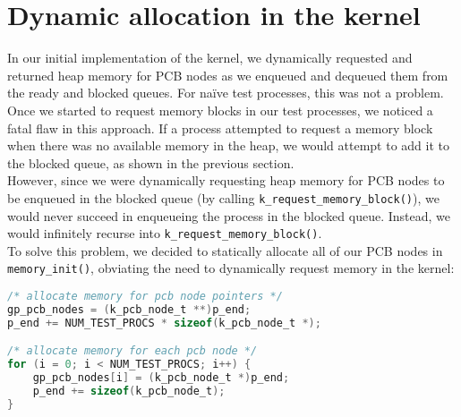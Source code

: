 \documentclass[12pt]{report}
\begin{document}
\section{Dynamic allocation in the kernel}

In our initial implementation of the kernel, we dynamically requested and returned heap memory for PCB nodes as we enqueued and dequeued them from the ready and blocked queues. For na\"{i}ve test processes, this was not a problem.\\

Once we started to request memory blocks in our test processes, we noticed a fatal flaw in this approach. If a process attempted to request a memory block when there was no available memory in the heap, we would attempt to add it to the blocked queue, as shown in the previous section.\\

However, since we were dynamically requesting heap memory for PCB nodes to be enqueued in the blocked queue (by calling \texttt{k_request_memory_block()}), we would never succeed in enqueueing the process in the blocked queue. Instead, we would infinitely recurse into \texttt{k_request_memory_block()}.\\

To solve this problem, we decided to statically allocate all of our PCB nodes in \texttt{memory_init()}, obviating the need to dynamically request memory in the kernel:

\begin{minipage}{\textwidth}
\begin{lstlisting}[language=C]
/* allocate memory for pcb node pointers */
gp_pcb_nodes = (k_pcb_node_t **)p_end;
p_end += NUM_TEST_PROCS * sizeof(k_pcb_node_t *);

/* allocate memory for each pcb node */
for (i = 0; i < NUM_TEST_PROCS; i++) {
    gp_pcb_nodes[i] = (k_pcb_node_t *)p_end;
    p_end += sizeof(k_pcb_node_t); 
}
\end{lstlisting}
\end{minipage}
\end{document}
